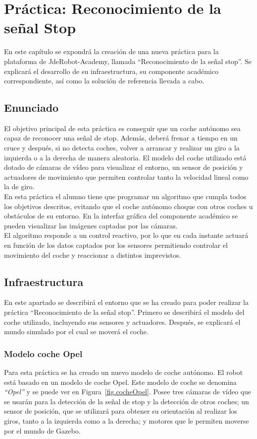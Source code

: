 \chapter{Práctica: Reconocimiento de la señal Stop}\label{cap.stop}
En este capítulo se expondrá la creación de una nueva práctica para la plataforma de JdeRobot-Academy, llamada ``Reconocimiento de la señal stop''. Se explicará el desarrollo de su infraestructura, su componente académico correspondiente, así como la solución de referencia llevada a cabo. 

\section{Enunciado} \label{sec.enunciado}
El objetivo principal de esta práctica es conseguir que un coche autónomo sea capaz de reconocer una señal de stop. Además, deberá frenar a tiempo en un cruce y después, si no detecta coches, volver a arrancar y realizar un giro a la izquierda o a la derecha de manera aleatoria. El modelo del coche utilizado está dotado de cámaras de vídeo para visualizar el entorno, un sensor de posición y actuadores de movimiento que permiten controlar tanto la velocidad lineal como la de giro. \\

En esta práctica el alumno tiene que programar un algoritmo que cumpla todos los objetivos descritos, evitando que el coche autónomo choque con otros coches u obstáculos de su entorno. En la interfaz gráfica del componente académico se pueden visualizar las imágenes captadas por las cámaras.\\

El algoritmo responde a un control reactivo, por lo que en cada instante actuará en función de los datos captados por los sensores permitiendo controlar el movimiento del coche y reaccionar a distintos imprevistos.

\section{Infraestructura}
En este apartado se describirá el entorno que se ha creado para poder realizar la práctica ``Reconocimiento de la señal stop''. Primero se describirá el modelo del coche utilizado, incluyendo sus sensores y actuadores. Después, se explicará el mundo simulado por el cual se moverá el coche. 

\subsection{Modelo coche Opel}
Para esta práctica se ha creado un nuevo modelo de coche autónomo. El robot está basado en un modelo de coche Opel. Este modelo de coche se denomina \textit{``Opel''} y se puede ver en Figura~\ref{fig.cocheOpel}. Posee tres cámaras de vídeo que se usarán para la detección de la señal de stop y la detección de otros coches; un sensor de posición, que se utilizará para obtener su orientación al realizar los giros, tanto a la izquierda como a la derecha; y motores que le permiten moverse por el mundo de Gazebo.

